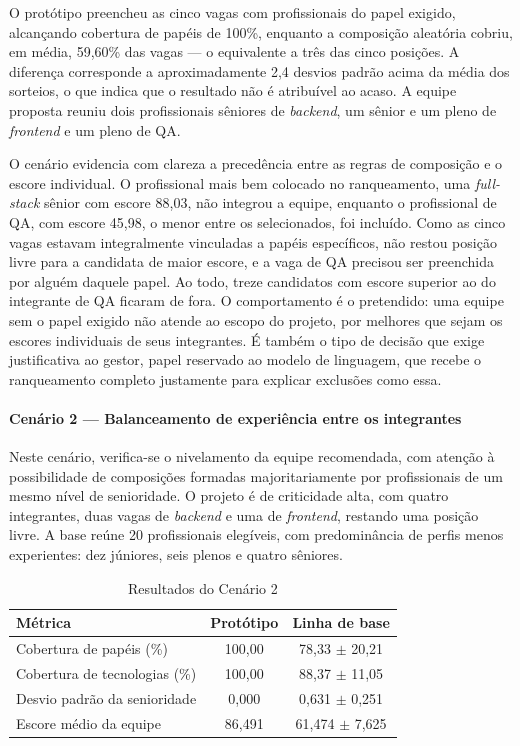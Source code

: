 O protótipo preencheu as cinco vagas com profissionais do papel exigido, alcançando cobertura de papéis de 100\%, enquanto a composição aleatória cobriu, em média, 59,60\% das vagas — o equivalente a três das cinco posições. A diferença corresponde a aproximadamente 2,4 desvios padrão acima da média dos sorteios, o que indica que o resultado não é atribuível ao acaso. A equipe proposta reuniu dois profissionais sêniores de \textit{backend}, um sênior e um pleno de \textit{frontend} e um pleno de QA.

O cenário evidencia com clareza a precedência entre as regras de composição e o escore individual. O profissional mais bem colocado no ranqueamento, uma \textit{full-stack} sênior com escore 88,03, não integrou a equipe, enquanto o profissional de QA, com escore 45,98, o menor entre os selecionados, foi incluído. Como as cinco vagas estavam integralmente vinculadas a papéis específicos, não restou posição livre para a candidata de maior escore, e a vaga de QA precisou ser preenchida por alguém daquele papel. Ao todo, treze candidatos com escore superior ao do integrante de QA ficaram de fora. O comportamento é o pretendido: uma equipe sem o papel exigido não atende ao escopo do projeto, por melhores que sejam os escores individuais de seus integrantes. É também o tipo de decisão que exige justificativa ao gestor, papel reservado ao modelo de linguagem, que recebe o ranqueamento completo justamente para explicar exclusões como essa.

\paragraph{Cenário 2 — Balanceamento de experiência entre os integrantes}

Neste cenário, verifica-se o nivelamento da equipe recomendada, com atenção à possibilidade de composições formadas majoritariamente por profissionais de um mesmo nível de senioridade. O projeto é de criticidade alta, com quatro integrantes, duas vagas de \textit{backend} e uma de \textit{frontend}, restando uma posição livre. A base reúne 20 profissionais elegíveis, com predominância de perfis menos experientes: dez júniores, seis plenos e quatro sêniores.

\begin{table}[htbp]
\centering
\caption{Resultados do Cenário 2}
\label{tab:cenario2}
\begin{tabular}{lcc}
\hline
\textbf{Métrica} & \textbf{Protótipo} & \textbf{Linha de base} \\
\hline
Cobertura de papéis (\%) & 100,00 & 78,33 $\pm$ 20,21 \\
Cobertura de tecnologias (\%) & 100,00 & 88,37 $\pm$ 11,05 \\
Desvio padrão da senioridade & 0,000 & 0,631 $\pm$ 0,251 \\
Escore médio da equipe & 86,491 & 61,474 $\pm$ 7,625 \\
\hline
\end{tabular}
\end{table}

